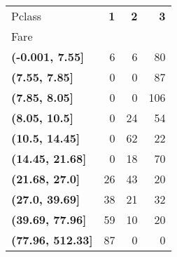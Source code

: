 \begin{tabular}{lrrr}
\toprule
Pclass & \textbf{1} & \textbf{2} & \textbf{3} \\
Fare &  &  &  \\
\midrule
\textbf{(-0.001, 7.55]} & 6 & 6 & 80 \\
\textbf{(7.55, 7.85]} & 0 & 0 & 87 \\
\textbf{(7.85, 8.05]} & 0 & 0 & 106 \\
\textbf{(8.05, 10.5]} & 0 & 24 & 54 \\
\textbf{(10.5, 14.45]} & 0 & 62 & 22 \\
\textbf{(14.45, 21.68]} & 0 & 18 & 70 \\
\textbf{(21.68, 27.0]} & 26 & 43 & 20 \\
\textbf{(27.0, 39.69]} & 38 & 21 & 32 \\
\textbf{(39.69, 77.96]} & 59 & 10 & 20 \\
\textbf{(77.96, 512.33]} & 87 & 0 & 0 \\
\bottomrule
\end{tabular}
